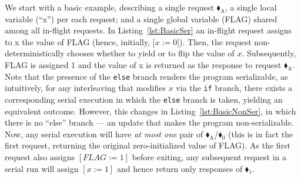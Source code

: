 We start with a basic example, describing a single request {\color{ForestGreen}$\blacklozenge_\text{A}$}, a single local variable (``x'') per each request; and a single global variable (FLAG) shared among all in-flight requests. 
%
In Listing~\ref{lst:BasicSer} an in-flight request assigns to x the value of FLAG (hence, initially, [$x:=0$]). Then, the request non-deterministically chooses whether to yield or to flip the value of $x$. Subsequently, FLAG is assigned 1 and the value of x is returned as the response to request {\color{ForestGreen}$\blacklozenge_\text{A}$}. 
%
Note that the presence of the \texttt{else} branch renders the program serializable, as intuitively, 
for any interleaving that modifies \(x\) via the \texttt{if} branch, there exists a corresponding serial execution in which the \texttt{else} branch is taken, yielding an equivalent outcome.
%
However, this changes in  Listing~\ref{lst:BasicNonSer},
%
%
%
%
%
%
%
%
%
in which there is no ``else'' branch --- an update that makes the program non-serializable.
%
Now, any serial execution will have \textit{at most one} pair of {\color{ForestGreen}$\blacklozenge_\text{A}$}/{\color{red}$\blacklozenge_0$} (this is in fact the first request, returning the original zero-initialized value of FLAG).
%
As the first request also assigns $[FLAG:=1]$ before exiting, any subsequent request in a serial run will assign $[x:=1]$ and hence return only responses of {\color{red}$\blacklozenge_1$}. 
